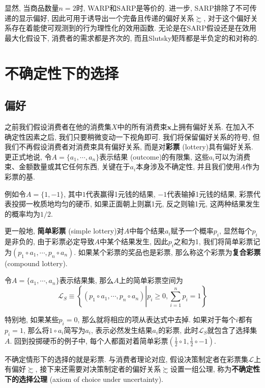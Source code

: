 \documentclass[cn, 12pt, math=mtpro2, bibstyle=apa, blue]{elegantbook}
\newcommand{\x}{\mathbf{x}}
\begin{document}
显然, 当商品数量$n=2$时, WARP和SARP是等价的. 进一步, SARP排除了不可传递的显示偏好, 因此可用于诱导出一个完备且传递的偏好关系$\succsim$, 对于这个偏好关系存在着能使可观测到的行为理性化的效用函数. 无论是在SARP假设还是在效用最大化假设下, 消费者的需求都是齐次的, 而且Slutsky矩阵都是半负定的和对称的.

\newpage
\section{不确定性下的选择}
\subsection{偏好}
之前我们假设消费者在他的消费集$X$中的所有消费束$\x$上拥有偏好关系. 在加入不确定性因素之后, 我们只要稍微变动一下视角即可. 我们将保留偏好关系的符号, 但我们不再假设消费者对消费束具有偏好关系, 而是对\textbf{彩票} (lottery)具有偏好关系. 更正式地说, 令$A=\{a_1,\cdots,a_n\}$表示结果 (outcome)的有限集, 这些$a_i$可以为消费束、金额数量或其它任何东西, 关键在于$a_i$本身涉及不确定性, 并且我们使用$A$作为彩票的基.

例如令$A=\{1,-1\}$, 其中$1$代表赢得1元钱的结果, $-1$代表输掉1元钱的结果, 彩票代表投掷一枚质地均匀的硬币, 如果正面朝上则赢1元, 反之则输1元, 这两种结果发生的概率均为$1/2$.

更一般地, \textbf{简单彩票} (simple lottery)对$A$中每个结果$a_i$赋予一个概率$p_i$, 显然每个$p_i$是非负的, 由于彩票必定导致$A$中某个结果发生, 因此$p_i$之和为1, 我们将简单彩票记为$(p_1\circ a_1,\cdots,p_n\circ a_n)$. 如果某个彩票的奖品也是彩票, 那么称这个彩票为\textbf{复合彩票} (compound lottery).

\begin{definition}[简单彩票]\label{def:def2.1}
令$A=\{a_1,\cdots,a_n\}$表示结果集, 那么$A$上的简单彩票空间为
$$\mathscr{L}_S\equiv\left\{(p_1\circ a_1,\cdots,p_n\circ a_n)\left|p_i\ge0, \sum_{i=1}^{n}p_i=1\right.\right\}$$
\end{definition}
特别地, 如果某些$p_i=0$, 那么就将相应的项从表达式中去掉. 如果对于每个$i$都有$p_i=1$, 那么将$1\circ a_i$简写为$a_i$, 表示必然发生结果$a_i$的彩票, 此时$\mathscr{L}_S$就包含了选择集$A$. 回到投掷硬币的例子中, 每个人都面对着简单彩票$(\frac{1}{2}\circ 1, \frac{1}{2}\circ -1)$. 

不确定情形下的选择的就是彩票. 与消费者理论对应, 假设决策制定者在彩票集$\mathscr{L}$上有偏好$\succsim$, 接下来还需要对决策制定者的偏好关系$\succsim$设置一组公理, 称为\textbf{不确定性下的选择公理} (axiom of choice under uncertainty).
\end{document}
